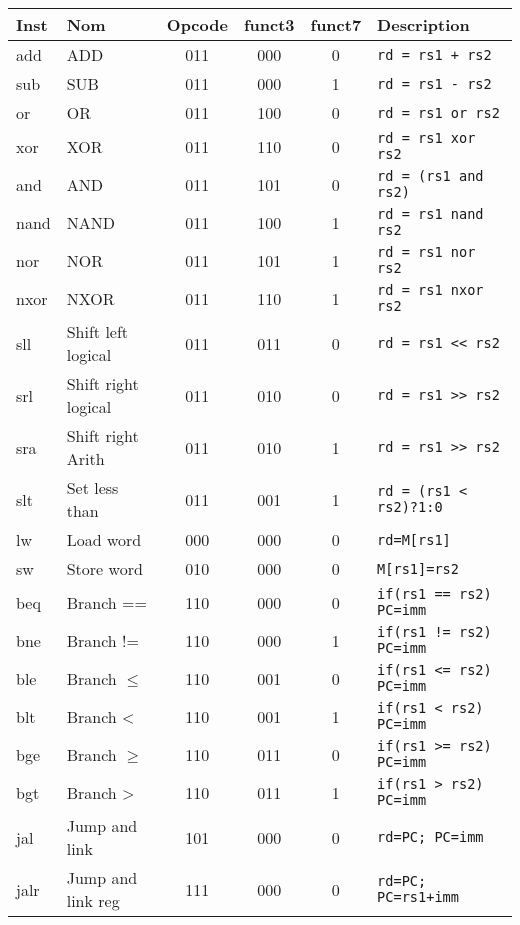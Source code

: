 \documentclass[a4paper]{article}
\begin{document}
    \begin{tabular}{|l|l|c|c|c|l|}
        \hline
        Inst & Nom                  & Opcode & funct3 & funct7 & Description                   \\
        \hline
        add  & ADD                  & 011    & 000    & 0      & \texttt{rd = rs1 + rs2}       \\
        sub  & SUB                  & 011    & 000    & 1      & \texttt{rd = rs1 - rs2}       \\
        or   & OR                   & 011    & 100    & 0      & \texttt{rd = rs1 or rs2}      \\
        xor  & XOR                  & 011    & 110    & 0      & \texttt{rd = rs1 xor rs2}     \\
        and  & AND                  & 011    & 101    & 0      & \texttt{rd = (rs1 and rs2)}   \\
        nand & NAND                 & 011    & 100    & 1      & \texttt{rd = rs1 nand rs2}    \\
        nor  & NOR                  & 011    & 101    & 1      & \texttt{rd = rs1 nor rs2}     \\
        nxor & NXOR                 & 011    & 110    & 1      & \texttt{rd = rs1 nxor rs2}    \\
        sll  & Shift left logical   & 011    & 011    & 0      & \texttt{rd = rs1 << rs2}      \\
        srl  & Shift right logical  & 011    & 010    & 0      & \texttt{rd = rs1 >> rs2}      \\
        sra  & Shift right Arith    & 011    & 010    & 1      & \texttt{rd = rs1 >> rs2}      \\
        slt  & Set less than        & 011    & 001    & 1      & \texttt{rd = (rs1 < rs2)?1:0} \\
        \hline
        lw   & Load word            & 000    & 000    & 0      & \texttt{rd=M[rs1]}            \\
        sw   & Store word           & 010    & 000    & 0      & \texttt{M[rs1]=rs2}           \\
        \hline
        beq  & Branch ==            & 110    & 000    & 0      & \texttt{if(rs1 == rs2) PC=imm}\\
        bne  & Branch !=            & 110    & 000    & 1      & \texttt{if(rs1 != rs2) PC=imm}\\
        ble  & Branch \(\leqslant\) & 110    & 001    & 0      & \texttt{if(rs1 <= rs2) PC=imm}\\
        blt  & Branch <             & 110    & 001    & 1      & \texttt{if(rs1 < rs2) PC=imm} \\
        bge  & Branch \(\geqslant\) & 110    & 011    & 0      & \texttt{if(rs1 >= rs2) PC=imm}\\
        bgt  & Branch >             & 110    & 011    & 1      & \texttt{if(rs1 > rs2) PC=imm} \\

        \hline
        jal  & Jump and link        & 101    & 000    & 0      &\texttt{rd=PC; PC=imm}         \\
        jalr & Jump and link reg    & 111    & 000    & 0      &\texttt{rd=PC; PC=rs1+imm}     \\
        \hline
    \end{tabular}
\end{document}
